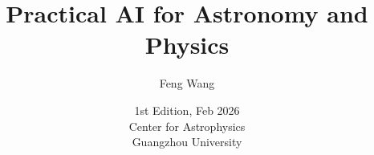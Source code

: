 \documentclass[11pt,a4paper,openany]{book}
\begin{document}
\title{Practical AI for Astronomy and Physics} %
\author{Feng Wang} %
\date{1st Edition, Feb 2026 \\ \vspace{1cm} Center for Astrophysics \\ Guangzhou University} %

\maketitle

\tableofcontents











\end{document}
